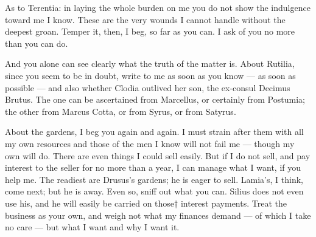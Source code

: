 

 As to Terentia: in laying the whole burden on me you do not show the indulgence toward me I know. These are the very wounds I cannot handle without the deepest groan. Temper it, then, I beg, so far as you can. I ask of you no more than you can do.

 And you alone can see clearly what the truth of the matter is. About Rutilia, since you seem to be in doubt, write to me as soon as you know --- as soon as possible --- and also whether Clodia outlived her son, the ex-consul Decimus Brutus. The one can be ascertained from Marcellus, or certainly from Postumia; the other from Marcus Cotta, or from Syrus, or from Satyrus.

 About the gardens, I beg you again and again. I must strain after them with all my own resources and those of the men I know will not fail me --- though my own will do. There are even things I could sell easily. But if I do not sell, and pay interest to the seller for no more than a year, I can manage what I want, if you help me. The readiest are Drusus's gardens; he is eager to sell. Lamia's, I think, come next; but he is away. Even so, sniff out what you can. Silius does not even use his, and he will easily be carried on those† interest payments. Treat the business as your own, and weigh not what my finances demand --- of which I take no care --- but what I want and why I want it.
